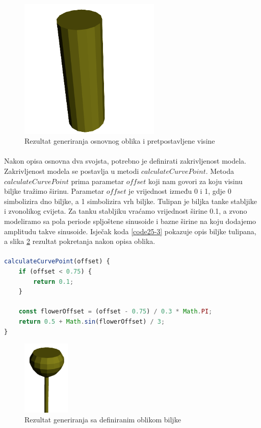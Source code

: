 \documentclass[times, utf8, diplomski]{fer}
\begin{document}
\begin{figure}[h]
	\centering
	\includegraphics[width=0.6\textwidth]{img/25-2}
	\caption{Rezultat generiranja osnovnog oblika i pretpostavljene visine}
	\label{fig:25-2}
\end{figure}

\paragraph{}
Nakon opisa osnovna dva svojsta, potrebno je definirati zakrivljenost modela. Zakrivljenost 
modela se postavlja u metodi $calculateCurvePoint$. Metoda $calculateCurvePoint$ prima 
parametar $offset$ koji nam govori za koju visinu biljke tražimo širinu. Parametar $offset$ 
je vrijednost između 0 i 1, gdje 0 simbolizira dno biljke, a 1 simbolizira vrh biljke.
Tulipan je biljka tanke stabljike i zvonolikog cvijeta. Za tanku stabljiku vraćamo 
vrijednost širine 0.1, a zvono modeliramo sa pola periode spljoštene sinusoide i bazne 
širine na koju dodajemo amplitudu takve sinusoide. Isječak koda \ref{code25-3} pokazuje opis 
biljke tulipana, a slika \ref{fig:25-3} rezultat pokretanja nakon opisa oblika.
\paragraph{}
\begin{lstlisting}[language=Javascript,caption=Postavljanje oblika biljke u ovisnosti o visinu od tla,label=code25-3]
calculateCurvePoint(offset) {
	if (offset < 0.75) {
		return 0.1;
	}

	const flowerOffset = (offset - 0.75) / 0.3 * Math.PI;
	return 0.5 + Math.sin(flowerOffset) / 3;
}
\end{lstlisting}

\begin{figure}[h]
	\centering
	\includegraphics[width=0.2\textwidth]{img/25-3}
	\caption{Rezultat generiranja sa definiranim oblikom biljke}
	\label{fig:25-3}
\end{figure}
\end{document}
